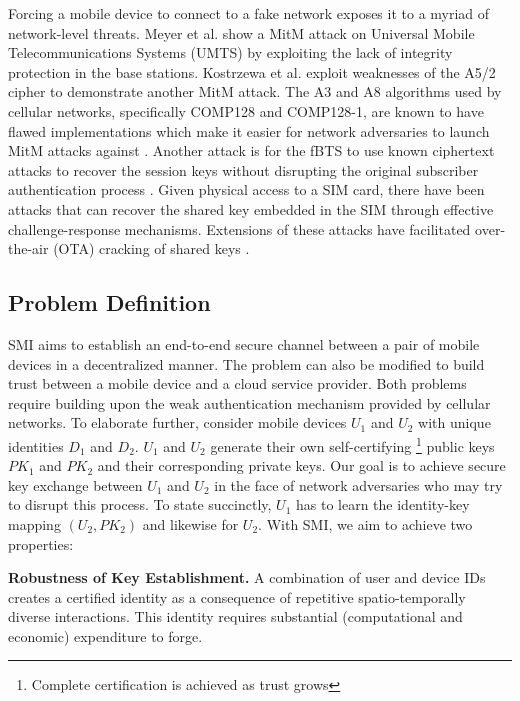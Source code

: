 \documentclass[letterpaper,twocolumn]{sig-alternate}
\begin{document}
Forcing a mobile device to connect to a fake network exposes it to a myriad of network-level threats. Meyer et al. \cite{germany} show a MitM attack on Universal Mobile Telecommunications Systems (UMTS) by exploiting the lack of integrity protection in the base stations. Kostrzewa et al. \cite{thesis} exploit weaknesses of the A5/2 \cite{comp128} cipher to demonstrate another MitM attack. The A3 and A8 algorithms used by cellular networks, specifically COMP128 and COMP128-1, are known to have flawed implementations which make it easier for network adversaries to launch MitM attacks against \cite{toorani2008solutions}. Another attack is for the fBTS to use known ciphertext attacks \cite{kca} to recover the session keys without disrupting the original subscriber authentication process \cite{barkan2003instant}. Given physical access to a SIM card, there have been attacks that can recover the shared key embedded in the SIM through effective challenge-response mechanisms. Extensions of these attacks have facilitated over-the-air (OTA) cracking of shared keys \cite{nohl,mathur2008radio}. 


\subsection{Problem Definition}
\label{definition}

SMI aims to establish an end-to-end secure channel between a pair of mobile devices in a decentralized manner. The problem can also be modified to build trust between a mobile device and a cloud service provider. Both problems require building upon the weak authentication mechanism provided by cellular networks. To elaborate further, consider mobile devices $U_1$ and $U_2$ with unique identities $D_1$ and $D_2$. $U_1$ and $U_2$ generate their own self-certifying \footnote{Complete certification is achieved as trust grows} public keys $PK_1$ and $PK_2$ and their corresponding private keys. Our goal is to achieve secure key exchange between $U_1$ and $U_2$ in the face of network adversaries who may try to disrupt this process. To state succinctly, $U_1$ has to learn the identity-key mapping $(U_2, PK_2)$ and likewise for $U_2$. With SMI, we aim to achieve two properties:

\textbf{Robustness of Key Establishment.} A combination of user and device IDs creates a certified identity as a consequence of repetitive spatio-temporally diverse interactions. This identity requires substantial (computational and economic) expenditure to forge.
\end{document}
